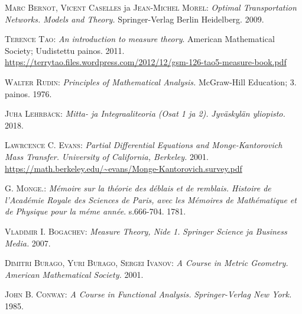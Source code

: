 
\appendix
\backmatter
\begin{thebibliography}{30}


\textsc{Marc Bernot}, \textsc{Vicent Caselles} ja \textsc{Jean-Michel Morel}:
\textit{Optimal Transportation Networks. Models and Theory.}
Springer-Verlag Berlin Heidelberg. 2009.

\textsc{Terence Tao}:
\textit{An introduction to measure theory}.
American Mathematical Society; Uudistettu painos. 2011. \\
\url{https://terrytao.files.wordpress.com/2012/12/gsm-126-tao5-measure-book.pdf}

\textsc{Walter Rudin}:
\textit{Principles of Mathematical Analysis.}
McGraw-Hill Education; 3. painos. 1976.

\textsc{Juha Lehrbäck}:
\textit{Mitta- ja Integraaliteoria (Osat 1 ja 2).}
\textit{Jyväskylän yliopisto.} 2018.

\textsc{Lawrcence C. Evans}:
\textit{Partial Differential Equations and Monge-Kantorovich Mass Transfer.}
\textit{University of California, Berkeley.} 2001.
\url{https://math.berkeley.edu/~evans/Monge-Kantorovich.survey.pdf}

\textsc{G. Monge.}:
\textit{Mémoire sur la théorie des déblais et de remblais. Histoire de l’Académie Royale des Sciences de Paris, avec les Mémoires de Mathématique et de Physique pour la méme année}. s.666-704. 1781.

\textsc{Vladimir I. Bogachev}:
\textit{Measure Theory, Nide 1.}
\textit{Springer Science ja Business Media.} 2007.

\textsc{Dimitri Burago, Yuri Burago, Sergei Ivanov}:
\textit{A Course in Metric Geometry.}
\textit{American Mathematical Society.} 2001.

\textsc{John B. Conway}:
\textit{A Course in Functional Analysis.}
\textit{Springer-Verlag New York.} 1985.


\end{thebibliography}
